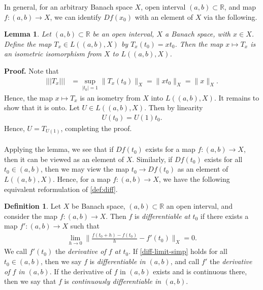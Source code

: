 \documentclass[12pt,reqno]{amsart}
\numberwithin{equation}{section}  %
\numberwithin{figure}{section}
\newcommand{\rr}{\mathbb{R}}
\theoremstyle{plain}
\newtheorem{lemma}{Lemma}
\theoremstyle{definition}
\newtheorem{definition}{Definition}
\theoremstyle{remark}
\begin{document}
%
%
In general, for an arbitrary Banach space $X$, open interval $(a,b) \subset
\rr$, and map $f:(a,b) \to X$, we can identify $Df(x_0)$ with an
element of $X$ via the following.
%
%
%
%
%
%
%
%
\begin{lemma}
	\label{lem:isometry} Let $(a,b) \subset \rr$ be an open interval, $X$ a Banach
	space, with $x \in X$. Define the map $T_x \in L\left ( (a,b) , X \right )$ by
	$T_x(t_0) = x t_0$. Then the map $x \mapsto T_x$ is an
	isometric isomorphism from
	$X$ to $L((a,b) , X)$. 
\end{lemma}
%
%
{\bf Proof.} Note that 
%
%
\begin{equation*}
	\begin{split}
		| | | T_x | | |
		& = \sup_{|t_0| = 1} \| T_x (t_0) \|_X
		= \| x t_0\|_X
		= \|x\|_X.
	\end{split}
\end{equation*}
%
%
Hence, the map $x \mapsto T_x$ is an isometry from $X$ into $L((a,b),
X)$. It remains to show that it is onto. Let $U \in L( (a,b), X)$. Then
by linearity
%
%
\begin{equation*}
	\begin{split}
		U(t_0) = U(1)t_0. 
	\end{split}
\end{equation*}
%
%
Hence, $U = T_{U(1)}$, completing the proof. \qquad \qedsymbol
\\
\\
Applying the lemma, we see that if $Df(t_0)$ exists for a map $f: (a,b) \to X$,
then it can be viewed as an
element of $X$. Similarly, if $Df(t_0)$ exists for all $t_0 \in (a,b)$, then
we may view the map $t_0 \to Df(t_0)$ as an
element of $L( (a,b), X)$. Hence, for a
map $f:(a,b) \to X$, we have the following equivalent reformulation of
\autoref{def:diff}. 
\begin{definition}
	\label{def:diff-simp}
	Let $X$ be Banach space, $(a,b) \subset \rr$ an open interval, and
	consider the map $f: (a,b) \to X$.
	Then $f$ is \emph{differentiable at $t_0$} if there exists a map
	$f': (a,b) \to X$ such that 
	\begin{equation}
		\label{diff-limit-simp}
		\begin{split}
			\lim_{h \to 0} \| \frac{f(t_0+ h) - f(t_0) 
			 }{h} - f'(t_0) \|_X = 0.
		\end{split}
	\end{equation}
	We call $f'(t_0)$ the \emph{derivative of $f$ at $t_0$}.
	If \eqref{diff-limit-simp}
	holds for all $t_0 \in (a,b)$, then we say $f$ is \emph{differentiable in
	$(a,b)$}, and call $f'$ the
	\emph{derivative of $f$ in $(a,b)$}.  If the derivative of $f$ in $(a,b)$
	exists and is continuous there, then we say that $f$ is
	\emph{continuously differentiable in $(a,b)$}. 	
\end{definition}
\end{document}
